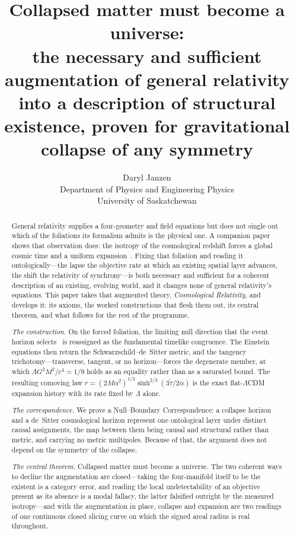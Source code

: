 \documentclass[11pt,a4paper]{article}
\title{Collapsed matter must become a universe:\\
\large the necessary and sufficient augmentation of general relativity into a description of structural existence, proven for gravitational collapse of any symmetry}
\author{Daryl Janzen\\
\small Department of Physics and Engineering Physics\\
\small University of Saskatchewan}
\date{}
\theoremstyle{plain}
\theoremstyle{definition}
\theoremstyle{remark}
\begin{document}
\maketitle

\begin{abstract}
General relativity supplies a four-geometry and field equations but does not single out which of the foliations its formalism admits is the physical one. A companion paper shows that observation does: the isotropy of the cosmological redshift forces a global cosmic time and a uniform expansion~\cite{JanzenModernParallax}. Fixing that foliation and reading it ontologically---the lapse the objective rate at which an existing spatial layer advances, the shift the relativity of synchrony---is both necessary and sufficient for a coherent description of an existing, evolving world, and it changes none of general relativity's equations. This paper takes that augmented theory, \emph{Cosmological Relativity}, and develops it: its axioms, the worked constructions that flesh them out, its central theorem, and what follows for the rest of the programme.

\emph{The construction.} On the forced foliation, the limiting null direction that the event horizon selects~\cite{JanzenBHcausality} is reassigned as the fundamental timelike congruence. The Einstein equations then return the Schwarzschild--de~Sitter metric, and the tangency trichotomy---transverse, tangent, or no horizon---forces the degenerate member, at which $\Lambda G^{2}M^{2}/c^{4}=1/9$ holds as an equality rather than as a saturated bound. The resulting comoving law $r=(2M\alpha^{2})^{1/3}\sinh^{2/3}(3\tilde\tau/2\alpha)$ is the exact flat-$\Lambda$CDM expansion history with its rate fixed by $\Lambda$ alone.

\emph{The correspondence.} We prove a Null--Boundary Correspondence: a collapse horizon and a de~Sitter cosmological horizon represent one ontological layer under distinct causal assignments, the map between them being causal and structural rather than metric, and carrying no metric multipoles. Because of that, the argument does not depend on the symmetry of the collapse.

\emph{The central theorem.} Collapsed matter must become a universe. The two coherent ways to decline the augmentation are closed---taking the four-manifold itself to be the existent is a category error, and reading the local undetectability of an objective present as its absence is a modal fallacy, the latter falsified outright by the measured isotropy---and with the augmentation in place, collapse and expansion are two readings of one continuous closed slicing curve on which the signed areal radius is real throughout.


\end{abstract}
\end{document}
